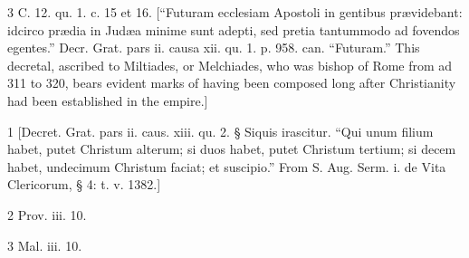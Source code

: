 3
C. 12. qu. 1. c. 15 et 16. [“Futuram ecclesiam Apostoli in gentibus prævidebant: idcirco prædia in Judæa minime sunt adepti, sed pretia tantummodo ad fovendos egentes.” Decr. Grat. pars ii. causa xii. qu. 1. p. 958. can. “Futuram.” This decretal, ascribed to Miltiades, or Melchiades, who was bishop of Rome from ad 311 to 320, bears evident marks of having been composed long after Christianity had been established in the empire.]

1
[Decret. Grat. pars ii. caus. xiii. qu. 2. § Siquis irascitur. “Qui unum filium habet, putet Christum alterum; si duos habet, putet Christum tertium; si decem habet, undecimum Christum faciat; et suscipio.” From S. Aug. Serm. i. de Vita Clericorum, § 4: t. v. 1382.]

2
Prov. iii. 10.

3
Mal. iii. 10.

